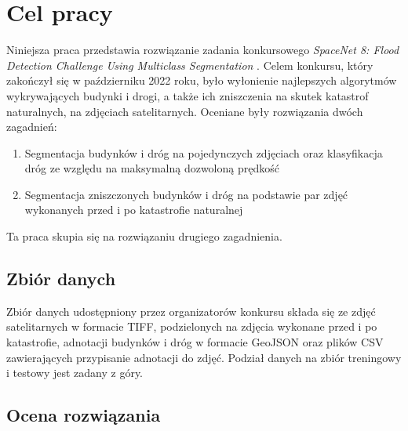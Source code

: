 \newpage %
\section{Cel pracy}
Niniejsza praca przedstawia rozwiązanie zadania konkursowego \textit{SpaceNet 8: Flood Detection Challenge Using Multiclass Segmentation} \cite{spacenet8}. Celem konkursu, który zakończył się w październiku 2022 roku, było wyłonienie najlepszych algorytmów wykrywających budynki i drogi, a także ich zniszczenia na skutek katastrof naturalnych, na zdjęciach satelitarnych. Oceniane były rozwiązania dwóch zagadnień:
\begin{enumerate}
\item Segmentacja budynków i dróg na pojedynczych zdjęciach oraz klasyfikacja dróg ze względu na maksymalną dozwoloną prędkość
\item Segmentacja zniszczonych budynków i dróg na podstawie par zdjęć wykonanych przed i po katastrofie naturalnej
\end{enumerate}
Ta praca skupia się na rozwiązaniu drugiego zagadnienia.
\subsection{Zbiór danych}
Zbiór danych udostępniony przez organizatorów konkursu składa się ze zdjęć satelitarnych w formacie TIFF, podzielonych na zdjęcia wykonane przed i po katastrofie, adnotacji budynków i dróg w formacie GeoJSON oraz plików CSV zawierających przypisanie adnotacji do zdjęć. Podział danych na zbiór treningowy i testowy jest zadany z góry.
\subsection{Ocena rozwiązania}


